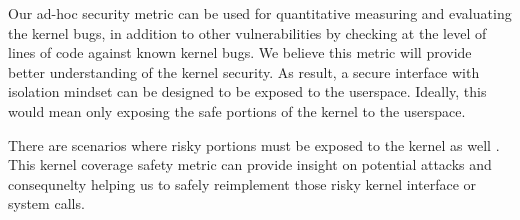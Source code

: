 


Our ad-hoc security metric can be used for quantitative measuring and evaluating the kernel bugs, 
in addition to other vulnerabilities by checking at the level of lines of code against known kernel bugs. 
We believe this metric will provide better understanding of the kernel security. 
As result, a secure interface with isolation mindset can be designed to be exposed to the userspace. 
Ideally, this would mean only exposing the safe portions of the kernel to the userspace. 

There are scenarios where risky portions must be exposed to the kernel as well . 
This kernel coverage safety metric can provide insight on potential attacks and consequnelty helping us 
to safely reimplement those risky kernel interface or system calls. 



